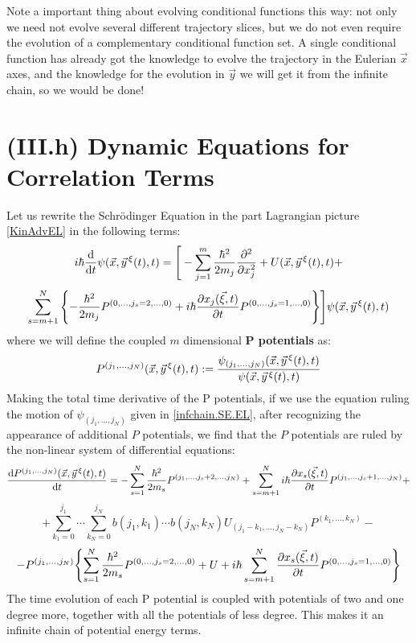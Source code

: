 \documentclass[11pt, a4paper]{article} %
\begin{document}
Note a important thing about evolving conditional functions this way: not only we need not evolve several different trajectory slices, but we do not even require the evolution of a complementary conditional function set. A single conditional function has already got the knowledge to evolve the trajectory in the Eulerian $\vec{x}$ axes, and the knowledge for the evolution in $\vec{y}$ we will get it from the infinite chain, so we would be done!

\section*{(III.h) Dynamic Equations for Correlation Terms\vspace{-0.15cm}}
Let us rewrite the Schrödinger Equation in the part Lagrangian picture \eqref{KinAdvEL} in the following terms:
\begin{equation}\label{Norsen}
i\hbar \dv{}{t}\psi(\vec{x},\vec{y}^{\, \xi}(t),t)=\Bigg[-\sum_{j=1}^m \frac{\hbar^2}{2m_j}\pdv[2]{}{x_j}+U(\vec{x},\vec{y}^{\, \xi}(t),t)+
\end{equation}
$$
\sum_{s=m+1}^N\qty{ -\frac{\hbar^2}{2m_j}P^{(0,...,j_s=2,...,0)}+i\hbar \pdv{x_j(\vec{\xi},t)}{t} P^{(0,...,j_s=1,...,0)} } \Bigg]\psi(\vec{x},\vec{y}^{\, \xi}(t),t)
$$
where we will define the coupled $m$ dimensional {\bf P potentials} as:\vspace{-0.1cm}
\begin{equation}\label{P}
P^{(j_1,...,j_N)}(\vec{x},\vec{y}^{\, \xi}(t),t):=\frac{\psi_{(j_1,...,j_N)}(\vec{x},\vec{y}^{\, \xi}(t),t)}{\psi(\vec{x},\vec{y}^{\, \xi}(t),t)}\vspace{-0.1cm}
\end{equation}
Making the total time derivative of the P potentials, if we use the equation ruling the motion of $\psi_{(j_1,...,j_N)}$ given in \eqref{infchain.SE.EL}, after recognizing the appearance of additional $P$ potentials, we find that the $P$ potentials are ruled by the non-linear system of differential equations:\vspace{-0.15cm}
\begin{equation}
\dv{P^{(j_1,...,j_N)}(\vec{x},\vec{y}^{\, \xi}(t),t)}{t}=-\sum_{s=1}^N\frac{\hbar^2}{2m_s}P^{(j_1,...,j_s+2,...,j_N)}+\sum_{s=m+1}^Ni\hbar \pdv{x_s(\vec{\xi},t)}{t} P^{(j_1,...,j_s+1,...,j_N)}+\vspace{-0.3cm}
\end{equation}
$$
+\sum_{k_1=0}^{j_1}\cdots\sum_{k_N=0}^{j_N} b(j_1,k_1)\cdots b(j_N,k_N)U_{(j_1-k_1,...,j_N-k_N)}P^{(k_1,...,k_N)}-
$$
$$
-P^{(j_1,...,j_N)}\qty{ \sum_{s=1}^N\frac{\hbar^2}{2m_s} P^{(0,...,j_s=2,...,0)}+U+i\hbar\sum_{s=m+1}^N \pdv{x_s(\vec{\xi},t)}{t}P^{(0,...,j_s=1,...,0)} }
$$
The time evolution of each P potential is coupled with potentials of two and one degree more, together with all the potentials of less degree. This makes it an infinite chain of potential energy terms.
\end{document}
